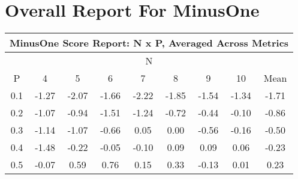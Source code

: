 \documentclass[11pt,a4paper]{report}
\begin{document}
\chapter{Overall Report For MinusOne}
\begin{longtable}{ | c || c | c | c | c | c | c | c || c |}
\hline
\multicolumn{9}{|c|}{ MinusOne Score Report: N x P, Averaged Across Metrics } \\
\hline
\multicolumn{9}{|c|}{ N } \\
\hline
P & 4 & 5 & 6 & 7 & 8 & 9 & 10 & Mean\\
\hline
\hline
\endhead
0.1 &  \cellcolor[HTML]{FFDFDF} -1.27 &  \cellcolor[HTML]{FFC7C7} -2.07 &  \cellcolor[HTML]{FFD7D7} -1.66 &  \cellcolor[HTML]{FFC7C7} -2.22 &  \cellcolor[HTML]{FFCFCF} -1.85 &  \cellcolor[HTML]{FFD7D7} -1.54 &  \cellcolor[HTML]{FFDFDF} -1.34 &  \cellcolor[HTML]{FFD7D7} -1.71 \\
0.2 &  \cellcolor[HTML]{FFE7E7} -1.07 &  \cellcolor[HTML]{FFE7E7} -0.94 &  \cellcolor[HTML]{FFD7D7} -1.51 &  \cellcolor[HTML]{FFDFDF} -1.24 &  \cellcolor[HTML]{FFEFEF} -0.72 &  \cellcolor[HTML]{FFF7F7} -0.44 &  \cellcolor[HTML]{FFFFFF} -0.10 &  \cellcolor[HTML]{FFE7E7} -0.86 \\
0.3 &  \cellcolor[HTML]{FFDFDF} -1.14 &  \cellcolor[HTML]{FFE7E7} -1.07 &  \cellcolor[HTML]{FFEFEF} -0.66 &  \cellcolor[HTML]{FFFFFF} 0.05 &  \cellcolor[HTML]{FFFFFF} 0.00 &  \cellcolor[HTML]{FFEFEF} -0.56 &  \cellcolor[HTML]{FFFFFF} -0.16 &  \cellcolor[HTML]{FFEFEF} -0.50 \\
0.4 &  \cellcolor[HTML]{FFD7D7} -1.48 &  \cellcolor[HTML]{FFF7F7} -0.22 &  \cellcolor[HTML]{FFFFFF} -0.05 &  \cellcolor[HTML]{FFFFFF} -0.10 &  \cellcolor[HTML]{FFFFFF} 0.09 &  \cellcolor[HTML]{FFFFFF} 0.09 &  \cellcolor[HTML]{FFFFFF} 0.06 &  \cellcolor[HTML]{FFF7F7} -0.23 \\
0.5 &  \cellcolor[HTML]{FFFFFF} -0.07 &  \cellcolor[HTML]{EFEFFF} 0.59 &  \cellcolor[HTML]{EFEFFF} 0.76 &  \cellcolor[HTML]{FFFFFF} 0.15 &  \cellcolor[HTML]{F7F7FF} 0.33 &  \cellcolor[HTML]{FFFFFF} -0.13 &  \cellcolor[HTML]{FFFFFF} 0.01 &  \cellcolor[HTML]{F7F7FF} 0.23 \\

\end{longtable}
\end{document}
